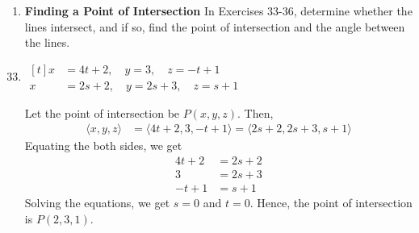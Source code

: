 \newpage

\begin{enumerate}[label={}, leftmargin=*]
    \item \textbf{Finding a Point of Intersection} In Exercises 33-36, determine whether the lines intersect, and if so, find the point of intersection and the angle between the lines.
\end{enumerate}

\begin{enumerate}
    \setcounter{enumi}{32}
    \item $\begin{aligned}[t] x & =4 t+2, \quad y=3, \quad z=-t+1 \\ x & =2 s+2, \quad y=2 s+3, \quad z=s+1\end{aligned}$

          \sol{} Let the point of intersection be $P(x, y, z)$. Then,
          \begin{align*}
              \langle x, y, z \rangle & = \langle 4t + 2, 3, -t + 1 \rangle = \langle 2s + 2, 2s + 3, s + 1 \rangle
          \end{align*}
          Equating the both sides, we get
          \begin{align*}
              4t + 2 & = 2s + 2 \\
              3      & = 2s + 3 \\
              -t + 1 & = s + 1
          \end{align*}
          Solving the equations, we get $s = 0$ and $t = 0$. Hence, the point of intersection is $P(2, 3, 1)$.


\end{enumerate}
